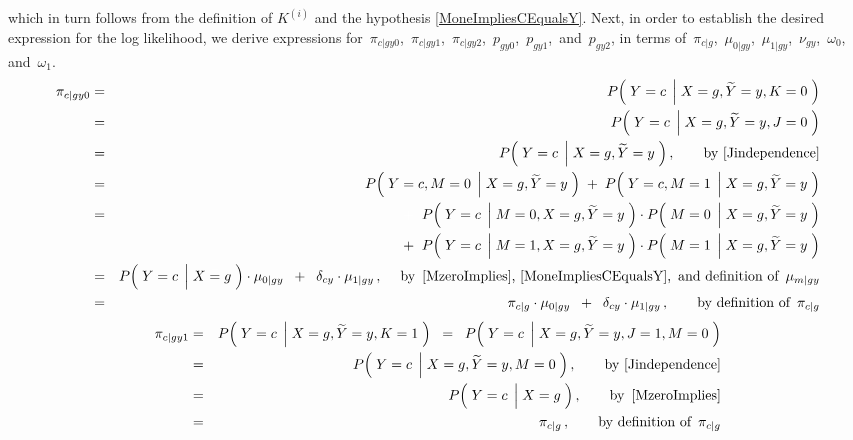 which in turn follows from the definition of $K^{(i)}$ and
the hypothesis \eqref{MoneImpliesCEqualsY}.
Next, in order to establish the desired expression for the log likelihood,
we derive expressions for
\,$\pi_{c \vert gy0}$,
\,$\pi_{c \vert gy1}$,
\,$\pi_{c \vert gy2}$,
\,$p_{gy0}$,
\,$p_{gy1}$,
\,and
\,$p_{gy2}$,
in terms of
\,$\pi_{c \vert g}$,
\,$\mu_{0 \vert gy}$,
\,$\mu_{1 \vert gy}$,
\,$\nu_{gy}$,
\,$\omega_{0}$,
\,and
\,$\omega_{1}$.
\begin{eqnarray*}
\pi_{c \vert gy0}
&=&
	P\!\left(\;Y=c\;\left\vert\;X=g,\widetilde{Y}=y,K=0\right.\,\right)
\\
&=&
	P\!\left(\;Y=c\;\left\vert\;X=g,\widetilde{Y}=y,J=0\right.\,\right)
\\
&=&
	P\!\left(\;Y=c\;\left\vert\;X=g,\widetilde{Y}=y\right.\,\right),
	\quad\quad
	\textnormal{by \eqref{Jindependence}}
\\
&=&
	P\!\left(\;Y=c,M=0\;\left\vert\;X=g,\widetilde{Y}=y\right.\,\right)
	\;+\;
	P\!\left(\;Y=c,M=1\;\left\vert\;X=g,\widetilde{Y}=y\right.\,\right)
\\
&=&
	{\color{white}+}\;\;
	P\!\left(\;Y=c\;\left\vert\;M=0,X=g,\widetilde{Y}=y\right.\,\right)
	\cdot
	P\!\left(\;M=0\;\left\vert\;X=g,\widetilde{Y}=y\right.\,\right)
\\
&&
	+\;\;
	P\!\left(\;Y=c\;\left\vert\;M=1,X=g,\widetilde{Y}=y\right.\,\right)
	\cdot
	P\!\left(\;M=1\;\left\vert\;X=g,\widetilde{Y}=y\right.\,\right)
\\
&=&
	P\!\left(\;Y=c\;\left\vert\;X\overset{{\color{white}-}}{=}g\right.\,\right)
	\cdot
	\mu_{0 \vert gy}
	\;\;+\;\;
	\delta_{cy}
	\cdot
	\mu_{1 \vert gy}\,,
	\quad\;
	\textnormal{by \,\eqref{MzeroImplies}, \eqref{MoneImpliesCEqualsY},\, and definition of \,$\mu_{m \vert gy}$}
\\
&=&
	\pi_{c \vert g}
	\cdot
	\mu_{0 \vert gy}
	\;\;+\;\;
	\delta_{cy}
	\cdot
	\mu_{1 \vert gy}\,,
	\quad\quad
	\textnormal{by definition of \,$\pi_{c \vert g}$}
\end{eqnarray*}
\begin{eqnarray*}
\pi_{c \vert gy1}
&=&
	P\!\left(\;Y=c\;\left\vert\;X=g,\widetilde{Y}=y,K=1\right.\,\right)
\;\;=\;\;
	P\!\left(\;Y=c\;\left\vert\;X=g,\widetilde{Y}=y,J=1,M=0\right.\,\right)
\\
&=&
	P\!\left(\;Y=c\;\left\vert\;X=g,\widetilde{Y}=y,M=0\right.\,\right),
	\quad\quad
	\textnormal{by \eqref{Jindependence}}
\\
&=&
	P\!\left(\;Y=c\;\left\vert\;X\overset{{\color{white}-}}{=}g\right.\,\right),
	\quad\quad
	\textnormal{by \,\eqref{MzeroImplies}}
\\
&=&
	\pi_{c \vert g}\,,
	\quad\quad
	\textnormal{by definition of \,$\pi_{c \vert g}$}
\end{eqnarray*}
